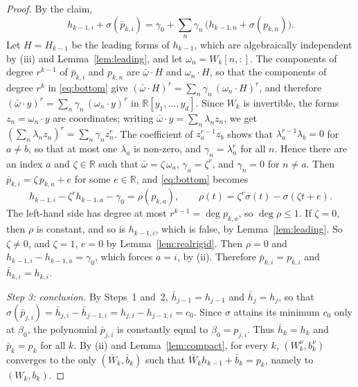 \documentclass[11pt]{article}
\theoremstyle{definition}
\theoremstyle{remark}
\newcommand{\R}{\mathbb{R}}
\begin{document}
\begin{proof}
By the claim,
\begin{equation}\label{eq:bottom}
h_{k-1,i}+\sigma(\bar p_{k,i})=\gamma_0+\sum_n\gamma_n\,\big(h_{k-1,n}+\sigma(p_{k,n})\big).
\end{equation}
Let $H=H_{k-1}$ be the leading forms of $h_{k-1}$, which are algebraically independent by (iii) and Lemma~\ref{lem:leading}, and let $\omega_n=W_k[n,:]$. The components of degree $r^{k-1}$ of $\bar p_{k,i}$ and $p_{k,n}$ are $\bar\omega\cdot H$ and $\omega_n\cdot H$, so that the components of degree $r^k$ in \eqref{eq:bottom} give $(\bar\omega\cdot H)^r=\sum_n\gamma_n\,(\omega_n\cdot H)^r$, and therefore $(\bar\omega\cdot y)^r=\sum_n\gamma_n\,(\omega_n\cdot y)^r$ in $\R[y_1,\dots,y_d]$. Since $W_k$ is invertible, the forms $z_n=\omega_n\cdot y$ are coordinates; writing $\bar\omega\cdot y=\sum_n\lambda_nz_n$, we get $(\sum_n\lambda_nz_n)^r=\sum_n\gamma_nz_n^r$. The coefficient of $z_a^{r-1}z_b$ shows that $\lambda_a^{r-1}\lambda_b=0$ for $a\ne b$, so that at most one $\lambda_a$ is non-zero, and $\gamma_n=\lambda_n^r$ for all $n$. Hence there are an index $a$ and $\zeta\in\R$ such that $\bar\omega=\zeta\,\omega_a$, $\gamma_a=\zeta^r$, and $\gamma_n=0$ for $n\ne a$. Then $\bar p_{k,i}=\zeta\,p_{k,a}+e$ for some $e\in\R$, and \eqref{eq:bottom} becomes
\[
h_{k-1,i}-\zeta^rh_{k-1,a}-\gamma_0=\rho(p_{k,a}),\qquad\rho(t)=\zeta^r\sigma(t)-\sigma(\zeta t+e).
\]
The left-hand side has degree at most $r^{k-1}=\deg p_{k,a}$, so $\deg\rho\le1$. If $\zeta=0$, then $\rho$ is constant, and so is $h_{k-1,i}$, which is false, by Lemma~\ref{lem:leading}. So $\zeta\ne0$, and $\zeta=1$, $e=0$ by Lemma~\ref{lem:realrigid}. Then $\rho=0$ and $h_{k-1,i}-h_{k-1,a}=\gamma_0$, which forces $a=i$, by (ii). Therefore $\bar p_{k,i}=p_{k,i}$ and $\bar h_{k,i}=h_{k,i}$.

\emph{Step 3: conclusion.} By Steps~1 and~2, $\bar h_{j-1}=h_{j-1}$ and $\bar h_j=h_j$, so that $\sigma(\bar p_{j,i})=\bar h_{j,i}-\bar h_{j-1,i}=h_{j,i}-h_{j-1,i}=c_0$. Since $\sigma$ attains its minimum $c_0$ only at $\beta_0$, the polynomial $\bar p_{j,i}$ is constantly equal to $\beta_0=p_{j,i}$. Thus $\bar h_k=h_k$ and $\bar p_k=p_k$ for all $k$. By (ii) and Lemma~\ref{lem:compact}, for every $k$, $(W^\nu_k,b^\nu_k)$ converges to the only $(\bar W_k,\bar b_k)$ such that $\bar W_kh_{k-1}+\bar b_k=p_k$, namely to $(W_k,b_k)$.
\end{proof}
\end{document}
